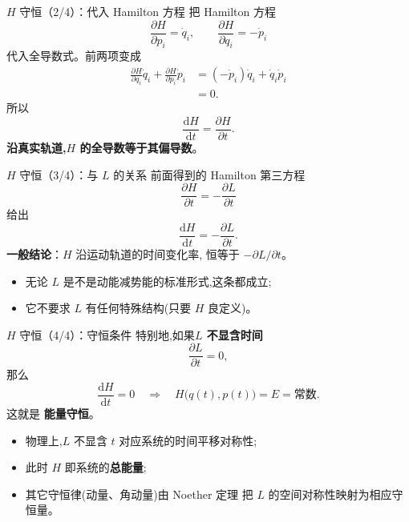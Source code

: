 \documentclass[fontset=windows, chinese, 10pt, xcolor=dvipsnames]{beamer}
\begin{document}
\begin{frame}{$H$ 守恒（2/4）：代入 Hamilton 方程}
  把 Hamilton 方程
  \begin{equation*}
    \frac{\partial H}{\partial p_i} = \dot q_i,\qquad
    \frac{\partial H}{\partial q_i} = -\dot p_i
  \end{equation*}
  代入全导数式。前两项变成
  \begin{align*}
    \frac{\partial H}{\partial q_i}\dot q_i + \frac{\partial H}{\partial p_i}\dot p_i
    &= (-\dot p_i)\dot q_i + \dot q_i\dot p_i \\
    &= 0.
  \end{align*}
  所以
  \begin{equation*}
    \boxed{\frac{\mathrm{d}H}{\mathrm{d}t}
          = \frac{\partial H}{\partial t}.}
  \end{equation*}
  \textbf{沿真实轨道,$H$ 的全导数等于其偏导数}。
\end{frame}

\begin{frame}{$H$ 守恒（3/4）：与 $L$ 的关系}
  前面得到的 Hamilton 第三方程
  \begin{equation*}
    \frac{\partial H}{\partial t} = -\frac{\partial L}{\partial t}
  \end{equation*}
  给出
  \begin{equation*}
    \frac{\mathrm{d}H}{\mathrm{d}t} = -\frac{\partial L}{\partial t}.
  \end{equation*}
  \textbf{一般结论}：$H$ 沿运动轨道的时间变化率,
  恒等于 $-\partial L/\partial t$。
  \begin{itemize}
    \item 无论 $L$ 是不是动能减势能的标准形式,这条都成立;
    \item 它不要求 $L$ 有任何特殊结构(只要 $H$ 良定义)。
  \end{itemize}
\end{frame}

\begin{frame}{$H$ 守恒（4/4）：守恒条件}
  特别地,如果\textbf{$L$ 不显含时间}
  \begin{equation*}
    \frac{\partial L}{\partial t} = 0,
  \end{equation*}
  那么
  \begin{equation*}
    \frac{\mathrm{d}H}{\mathrm{d}t} = 0
    \quad\Longrightarrow\quad
    H\bigl(q(t),p(t)\bigr) = E = \text{常数}.
  \end{equation*}
  这就是 \textbf{能量守恒}。
  \begin{itemize}
    \item 物理上,$L$ 不显含 $t$ 对应系统的时间平移对称性;
    \item 此时 $H$ 即系统的\textbf{总能量};
    \item 其它守恒律(动量、角动量)由 Noether 定理
      把 $L$ 的空间对称性映射为相应守恒量。
  \end{itemize}
\end{frame}
\end{document}
